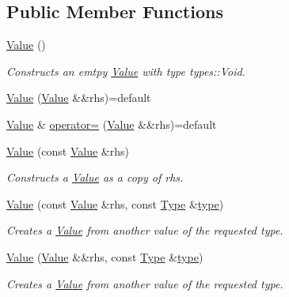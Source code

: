 \subsection*{Public Member Functions}
\begin{DoxyCompactItemize}
\item 
\hyperlink{classdg_1_1deepcore_1_1_value_aa4f1ef5b6a16fa851cd06253f6ffef2c}{Value} ()
\begin{DoxyCompactList}\small\item\em Constructs an emtpy \hyperlink{classdg_1_1deepcore_1_1_value}{Value} with type types\+::\+Void. \end{DoxyCompactList}\item 
\hyperlink{classdg_1_1deepcore_1_1_value_aa08bda94215e91fc03d3e38a5b1348de}{Value} (\hyperlink{classdg_1_1deepcore_1_1_value}{Value} \&\&rhs)=default
\item 
\hyperlink{classdg_1_1deepcore_1_1_value}{Value} \& \hyperlink{classdg_1_1deepcore_1_1_value_a9f0316a85555b1bcde4facecc2905396}{operator=} (\hyperlink{classdg_1_1deepcore_1_1_value}{Value} \&\&rhs)=default
\item 
\hyperlink{classdg_1_1deepcore_1_1_value_aef9026014190099f1335f2d70499f81d}{Value} (const \hyperlink{classdg_1_1deepcore_1_1_value}{Value} \&rhs)
\begin{DoxyCompactList}\small\item\em Constructs a \hyperlink{classdg_1_1deepcore_1_1_value}{Value} as a copy of {\ttfamily rhs}. \end{DoxyCompactList}\item 
\hyperlink{classdg_1_1deepcore_1_1_value_af338e27e1d0203eb3712ea7f816a8888}{Value} (const \hyperlink{classdg_1_1deepcore_1_1_value}{Value} \&rhs, const \hyperlink{classdg_1_1deepcore_1_1_type}{Type} \&\hyperlink{classdg_1_1deepcore_1_1_value_abbcca617f78f66202f6ec22967338dcf}{type})
\begin{DoxyCompactList}\small\item\em Creates a \hyperlink{classdg_1_1deepcore_1_1_value}{Value} from another value of the requested type. \end{DoxyCompactList}\item 
\hyperlink{classdg_1_1deepcore_1_1_value_a7f8b947ef0aa234d99a2a857607b94bd}{Value} (\hyperlink{classdg_1_1deepcore_1_1_value}{Value} \&\&rhs, const \hyperlink{classdg_1_1deepcore_1_1_type}{Type} \&\hyperlink{classdg_1_1deepcore_1_1_value_abbcca617f78f66202f6ec22967338dcf}{type})
\begin{DoxyCompactList}\small\item\em Creates a \hyperlink{classdg_1_1deepcore_1_1_value}{Value} from another value of the requested type. \end{DoxyCompactList}\item 

\end{DoxyCompactItemize}
